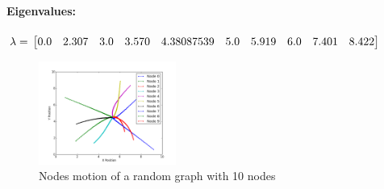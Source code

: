 \documentclass[12pt]{article}
\begin{document}
\paragraph{\textbf{Eigenvalues:}}

$
\lambda =  \\
\begin{bmatrix}
0.0 &   2.307 &   3.0  &   3.570  &  4.38087539 &  5.0 &  5.919 &   6.0 &   7.401 &   8.422
\end{bmatrix} 
$

\begin{figure}[htbp]
\centering
\includegraphics[width=0.4\textwidth]{./C4_mo}
\caption{Nodes motion of a random graph with 10 nodes}
\label{fig:C4_mo}
\end{figure}
\end{document}
